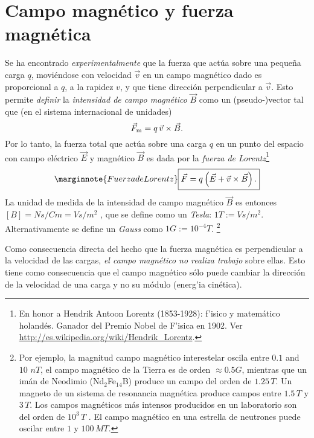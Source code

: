 \section{Campo magnético y fuerza magnética}
Se ha encontrado \textit{experimentalmente} que la fuerza que actúa sobre una peque\~na carga $q$, moviéndose con velocidad $\vec{v}$ en un campo magnético dado es proporcional a $q$, a la rapidez $v$, y que tiene dirección perpendicular a $\vec{v}$. Esto permite \textit{definir}  la \textit{intensidad de campo magnético} $\vec{B}$ como un (pseudo-)vector tal que (en el sistema internacional de unidades)
\begin{equation}
 \vec{F}_{\rm m}=q\,\vec{v}\times\vec{B}.
\end{equation}
Por lo tanto, la fuerza total que actúa sobre una carga $q$ en un punto del espacio con campo eléctrico $\vec{E}$ y magnético $\vec{B}$ es dada por la \textit{fuerza de Lorentz}\footnote{En honor a Hendrik Antoon Lorentz (1853-1928): f'isico y matemático holandés. Ganador del Premio Nobel de F'isica en 1902. Ver \url{http://es.wikipedia.org/wiki/Hendrik_Lorentz}.}
\begin{equation}\marginnote{Fuerza de Lorentz}
\boxed{ \vec{F}=q\left(\vec{E}+\vec{v}\times\vec{B}\right).}
\end{equation}
La unidad de medida de la intensidad de campo magnético $\vec{B}$ es entonces  $[B]=Ns/Cm=Vs/m^2$ , que se define como un \textit{Tesla}: $1T:=Vs/m^2$. Alternativamente se define un
\textit{Gauss} como $1G:=10^{-4}T$. \footnote{Por ejemplo, la magnitud campo
magnético interestelar oscila entre $0.1$ and $10$ $nT$, el campo magnético
de la Tierra es de orden $\approx 0.5 G$, mientras que un imán
de Neodimio (Nd${}_2$Fe${}_{14}$B) produce un campo del orden de $1.25\, T$.
Un magneto de un sistema de resonancia magnética produce campos entre $1.5\,T$
y $3\,T$. Los campos magnéticos más intensos producidos en un laboratorio son
del orden de $10^3\,T$ \cite{Brecord2018}. El campo magnético en una estrella de neutrones puede oscilar entre $1$ y $100\, MT$.}

Como consecuencia directa del hecho que la fuerza magnética es perpendicular a
la velocidad de las cargas, \textit{el campo magnético no realiza trabajo} sobre ellas.
Esto tiene como consecuencia que el campo magnético sólo puede cambiar la
dirección de la velocidad de una carga y no su módulo (energ'ia cinética).

